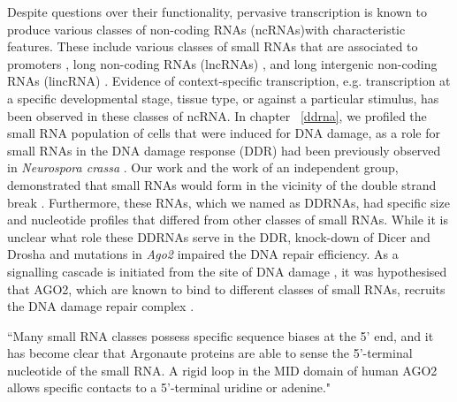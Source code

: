 Despite questions over their functionality, pervasive transcription is known to produce various classes of non-coding RNAs (ncRNAs)with characteristic features. These include various classes of small RNAs that are associated to promoters \citep{pmid19920851}, long non-coding RNAs (lncRNAs) \citep{pmid24290031}, and long intergenic non-coding RNAs (lincRNA) \citep{pmid23818866}. Evidence of context-specific transcription, e.g. transcription at a specific developmental stage, tissue type, or against a particular stimulus, has been observed in these classes of ncRNA. In chapter ~\ref{ddrna}, we profiled the small RNA population of cells that were induced for DNA damage, as a role for small RNAs in the DNA damage response (DDR) had been previously observed in \textit{Neurospora crassa} \citep{pmid19444217}. Our work and the work of an independent group, demonstrated that small RNAs would form in the vicinity of the double strand break \citep{francia2012site,pmid22445173}. Furthermore, these RNAs, which we named as DDRNAs, had specific size and nucleotide profiles that differed from other classes of small RNAs. While it is unclear what role these DDRNAs serve in the DDR, knock-down of Dicer and Drosha \citep{francia2012site} and mutations in \textit{Ago2} \citep{pmid22445173} impaired the DNA repair efficiency. As a signalling cascade is initiated from the site of DNA damage \citep{pmid19847258}, it was hypothesised that AGO2, which are known to bind to different classes of small RNAs, recruits the DNA damage repair complex \citep{pmid22445173}.

``Many small RNA classes possess specific sequence biases at the 5' end, and it has become clear that Argonaute proteins are able to sense the 5'-terminal nucleotide of the small RNA. A rigid loop in the MID domain of human AGO2 allows specific contacts to a 5'-terminal uridine or adenine."

